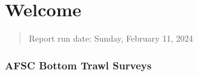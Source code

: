 \documentclass[
  letterpaper,
  oneside,
  open=any]{scrbook}
\renewcommand*\contentsname{Table of contents}
\newcommand\contentsname{Table of contents}
\begin{document}
\begin{frontmatter}
\begin{titlepage}
\begin{minipage}[b][\textheight][s]{\minipagewidth}
\titleblock

\authorblock

\affiliationblock

\vfill

\logoblock

\footerblock
\par

\end{minipage}
\clearpage
\restoregeometry
\end{titlepage}
\setcounter{page}{1}
\end{frontmatter}


\renewcommand*\contentsname{Table of contents}
{
\setcounter{tocdepth}{1}
\tableofcontents
}
\listoffigures
\listoftables
\mainmatter
\part{Welcome}

\begin{quote}
Report run date: Sunday, February 11, 2024
\end{quote}

\hypertarget{afsc-bottom-trawl-surveys}{%
\section*{AFSC Bottom Trawl Surveys}\label{afsc-bottom-trawl-surveys}}

\end{document}
